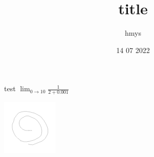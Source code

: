 \title{title}
\author{hmys}
\date{14 07 2022}

\maketitle

\par
test $\lim_{0 \to 10} \frac{1}{2 + 0.001}$

\includegraphics{drawing}


